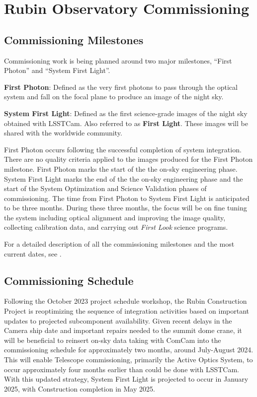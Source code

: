 \section{Rubin Observatory Commissioning}
\label{sec:commissioning}

\subsection{Commissioning Milestones}
\label{ssec:commissioning-milestones}

Commissioning work is being planned around two major milestones, ``First Photon'' and ``System First Light''. 

\textbf {First Photon}: Defined as the very first photons to pass through the optical system and fall on the  focal plane to produce an image of the night sky.

\textbf {System First Light}: Defined as the first science-grade images of the night sky obtained with LSSTCam. 
Also referred to as \textbf{First Light}. 
These images will be shared with the worldwide community. 

First Photon occurs following the successful completion of system integration. 
There are no quality criteria applied to the images produced for the First Photon milestone. 
First Photon  marks the start of the the on-sky engineering phase.
System First Light  marks the end of the the on-sky engineering phase and the start of the System Optimization and Science Validation phases of commissioning.
The time from First Photon to System First Light is anticipated to be three months.
During these three months, the focus will be on fine tuning the system including optical alignment and improving the image quality, collecting calibration data, and carrying out \textit{First Look} science programs. 

For a detailed description of all the commissioning milestones and the most current dates, see .

\subsection{Commissioning Schedule}
\label{ssec:commissioning-schedule}

Following the October 2023 project schedule workshop, the Rubin Construction Project is reoptimizing the sequence of integration activities based on important updates to projected subcomponent availability.
Given recent delays in the Camera ship date and important repairs needed to the summit dome crane, it will be beneficial to reinsert on-sky data taking with ComCam into the commissioning schedule for approximately two months, around July-August 2024. 
This will enable Telescope commissioning, primarily the Active Optics System, to occur approximately four months earlier than could be done with LSSTCam. 
With this updated strategy, System First Light  is projected to occur in January 2025, with Construction completion in May 2025.

